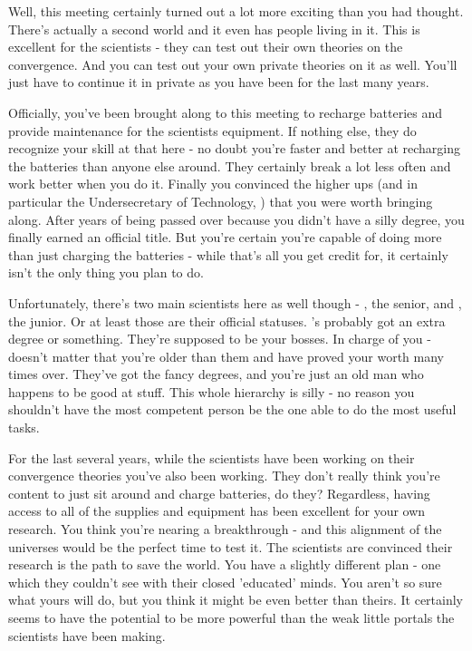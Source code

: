 \documentclass[char]{guildcamp3}
\begin{document}
\name{\cTech{}}


Well, this meeting certainly turned out a lot more exciting than you had thought. There's actually a second world and it even has people living in it. This is excellent for the scientists - they can test out their own theories on the convergence. And you can test out your own private theories on it as well. You'll just have to continue it in private as you have been for the last many years. 

Officially, you've been brought along to this meeting to recharge batteries and provide maintenance for the scientists equipment. If nothing else, they do recognize your skill at that here - no doubt you're faster and better at recharging the batteries than anyone else around. They certainly break a lot less often and work better when you do it. Finally you convinced the higher ups (and in particular the Undersecretary of Technology, \cPoliTwo{\intro}) that you were worth bringing along. After years of being passed over because you didn't have a silly degree, you finally earned an official title. But you're certain you're capable of doing more than just charging the batteries  - while that's all you get credit for, it certainly isn't the only thing you plan to do. 

Unfortunately, there's two main scientists here as well though - \cSciOne{\intro}, the senior, and \cSciTwo{\intro}, the junior. Or at least those are their official statuses. \cSciOne{}'s probably got an extra degree or something. They're supposed to be your bosses. In charge of you - doesn't matter that you're older than them and have proved your worth many times over. They've got the fancy degrees, and you're just an old man who happens to be good at stuff. This whole hierarchy is silly - no reason you shouldn't have the most competent person be the one able to do the most useful tasks. 

For the last several years, while the scientists have been working on their convergence theories you've also been working. They don't really think you're content to just sit around and charge batteries, do they? Regardless, having access to all of the supplies and equipment has been excellent for your own research. You think you're nearing a breakthrough - and this alignment of the universes would be the perfect time to test it. The scientists are convinced their research is the path to save the world. You have a slightly different plan - one which they couldn't see with their closed 'educated' minds. You aren't so sure what yours will do, but you think it might be even better than theirs. It certainly seems to have the potential to be more powerful than the weak little portals the scientists have been making. 
\end{document}
